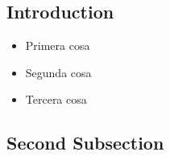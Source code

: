 \subsection{Introduction}

\begin{itemize}
\item Primera cosa
\item Segunda cosa
\item Tercera cosa
\end{itemize}

\subsection{Second Subsection}